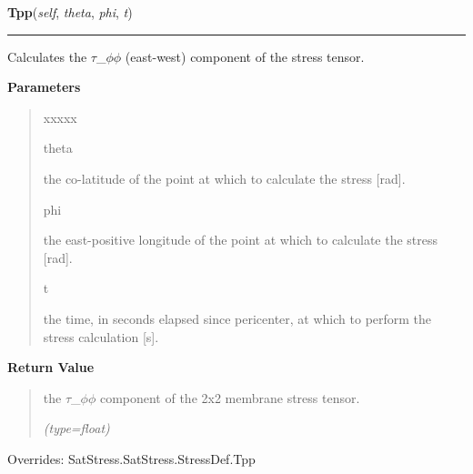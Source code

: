     \vspace{0.5ex}

\hspace{.8\funcindent}\begin{boxedminipage}{\funcwidth}

    \raggedright \textbf{Tpp}(\textit{self}, \textit{theta}, \textit{phi}, \textit{t})

    \vspace{-1.5ex}

    \rule{\textwidth}{0.5\fboxrule}
\setlength{\parskip}{2ex}
    Calculates the \(\tau\)\_\(\phi\)\(\phi\) (east-west) component of the 
    stress tensor.

\setlength{\parskip}{1ex}
      \textbf{Parameters}
      \vspace{-1ex}

      \begin{quote}
        \begin{Ventry}{xxxxx}

          \item[theta]

          the co-latitude of the point at which to calculate the stress 
          [rad].

          \item[phi]

          the east-positive longitude of the point at which to calculate 
          the stress [rad].

          \item[t]

          the time, in seconds elapsed since pericenter, at which to 
          perform the stress calculation [s].

        \end{Ventry}

      \end{quote}

      \textbf{Return Value}
    \vspace{-1ex}

      \begin{quote}
      the \(\tau\)\_\(\phi\)\(\phi\) component of the 2x2 membrane stress 
      tensor.

      {\it (type=float)}

      \end{quote}

      Overrides: SatStress.SatStress.StressDef.Tpp

    \end{boxedminipage}

